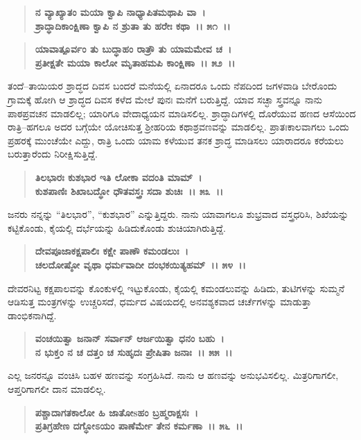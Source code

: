 \begin{verse}
\textbf{ನ ವ್ಯಾಖ್ಯಾತಂ ಮಯಾ ಕ್ವಾಪಿ ನಾಧ್ಯಾಪಿತಮಥಾಪಿ ವಾ~।}\\\textbf{ಶ್ರಾದ್ಧಾದಿಕಾಂಕ್ಷಿಣಾ ಕ್ವಾಪಿ ನ ಶ್ರುತಾ ತು ಹರೇಃ ಕಥಾ~।। ೫೧~।। }
\end{verse}

\begin{verse}
\textbf{ಯಾವಾತ್ಪೂರ್ವಂ ತು ಬುದ್ಧಾಹಂ ರಾತ್ರೌ ತು ಯಾಮಮೇವ ಚ~।}\\\textbf{ಪ್ರತೀಕ್ಷತೇ ಮಯಾ ಕಾಲೋ ಮೃತಾಹಮಪಿ ಕಾಂಕ್ಷಿಣಾ~।। ೫೨~।।}
\end{verse}

ತಂದೆ–ತಾಯಿಯರ ಶ್ರಾದ್ಧದ ದಿವಸ ಬಂದರೆ ಮನೆಯಲ್ಲಿ ಏನಾದರೂ ಒಂದು ನೆಪದಿಂದ ಜಗಳವಾಡಿ ಬೇರೊಂದು ಗ್ರಾಮಕ್ಕೆ ಹೋಗಿ ಆ ಶ್ರಾದ್ಧದ ದಿವಸ ಕಳೆದ ಮೇಲೆ ಪುನಃ ಮನೆಗೆ ಬರುತ್ತಿದ್ದೆ. ಯಾವ ಸಚ್ಛಾ ಸ್ತ್ರವನ್ನೂ ನಾನು ಪಾಠಪ್ರವಚನ ಮಾಡಲಿಲ್ಲ; ಯಾರಿಗೂ ವೇದಾಧ್ಯಯನ ಮಾಡಿಸಲಿಲ್ಲ. ಶ್ರಾದ್ಧಾದಿಗಳಲ್ಲಿ ದೊರೆಯುವ ಹಣದ ಆಸೆಯಿಂದ ರಾತ್ರಿ–ಹಗಲೂ ಅದರ ಬಗ್ಗೆಯೇ ಯೋಚಿಸುತ್ತ ಶ‍್ರೀಹರಿಯ ಕಥಾಶ್ರವಣವನ್ನು ಮಾಡಲಿಲ್ಲ. ಪ್ರಾತಃಕಾಲವಾಗಲು ಒಂದು ಪ್ರಹರಕ್ಕೆ ಮುಂಚೆಯೇ ಎದ್ದು, ರಾತ್ರಿ ಒಂದು ಯಾಮ ಕಳೆಯುವ ತನಕ ಶ್ರಾದ್ಧ ಮಾಡಿಸಲು ಯಾರಾದರೂ ಕರೆಯಲು ಬರುತ್ತಾರೆಂದು ನಿರೀಕ್ಷಿಸುತ್ತಿದ್ದೆ.

\begin{verse}
\textbf{ತಿಲಭಾರಃ ಕುಶಭಾರ ಇತಿ ಲೋಕಾ ವದಂತಿ ಮಾಮ್~।}\\\textbf{ಕುಶಪಾಣಿಃ ಶಿಖಾಬದ್ಧೋ ಧೌತವಸ್ತ್ರಃ ಸದಾ ಶುಚಿಃ~।। ೫೩~।।}
\end{verse}

ಜನರು ನನ್ನನ್ನು “ತಿಲಭಾರ”, “ಕುಶಭಾರ” ಎನ್ನುತ್ತಿದ್ದರು. ನಾನು ಯಾವಾಗಲೂ ಶುಭ್ರವಾದ ವಸ್ತ್ರಧರಿಸಿ, ಶಿಖೆಯನ್ನು ಕಟ್ಟಿಕೊಂಡು, ಕೈಯಲ್ಲಿ ದರ್ಭೆಯನ್ನು ಹಿಡಿದುಕೊಂಡು ಶುಚಿಯಾಗಿರುತ್ತಿದ್ದೆ.

\begin{verse}
\textbf{ದೇವಪೂಜಾಕಕ್ಷಪಾಲಿಃ ಕಕ್ಷೇ ಪಾಣೌ ಕಮಂಡಲುಃ~।}\\\textbf{ಚಲದೋಷ್ಠೋ ವೃಥಾ ಧರ್ಮವಾದೀ ದಂಭಕಯಿತ್ಯಹಮ್~।। ೫೪~।।}
\end{verse}

ದೇವರನಿಟ್ಟ ಕಕ್ಷಪಾಲವನ್ನು ಕೊಂಕುಳಲ್ಲಿ ಇಟ್ಟುಕೊಂಡು, ಕೈಯಲ್ಲಿ ಕಮಂಡಲುವನ್ನು ಹಿಡಿದು, ತುಟಿಗಳನ್ನು ಸುಮ್ಮನೆ ಆಡಿಸುತ್ತ ಮಂತ್ರಗಳನ್ನು ಉಚ್ಚರಿಸದೆ, ಧರ್ಮದ ವಿಷಯದಲ್ಲಿ ಅನವಶ್ಯಕವಾದ ಚರ್ಚೆಗಳನ್ನು ಮಾಡುತ್ತಾ ಡಾಂಭಿಕನಾಗಿದ್ದೆ.

\begin{verse}
\textbf{ವಂಚಯಿತ್ವಾ ಜನಾನ್ ಸರ್ವಾನ್ ಆರ್ಜಯಿತ್ವಾ ಧನಂ ಬಹು~।}\\\textbf{ನ ಭುಕ್ತಂ ನ ಚ ದತ್ತಂ ಚ ಸುಹೃದಃ ಪ್ರೇಷಿತಾ ಜನಾಃ~।। ೫೫~।।}
\end{verse}

ಎಲ್ಲ ಜನರನ್ನೂ ವಂಚಿಸಿ ಬಹಳ ಹಣವನ್ನು ಸಂಗ್ರಹಿಸಿದೆ. ನಾನು ಆ ಹಣವನ್ನು ಅನುಭವಿಸಲಿಲ್ಲ. ಮಿತ್ರರಿಗಾಗಲೀ, ಆಪ್ತರಿಗಾಗಲೀ ದಾನ ಮಾಡಲಿಲ್ಲ.

\begin{verse}
\textbf{ಪಶ್ಚಾದಾಗತಕಾಲೋ ಹಿ ಜಾತೋsಹಂ ಬ್ರಹ್ಮರಾಕ್ಷಸಃ~।}\\\textbf{ಪ್ರತಿಗ್ರಹೇಣ ದಗ್ಧೋಽಯಂ ಪಾಣೆರ್ಮೇ ತೇನ ಕರ್ಮಣಾ~।। ೫೬~।।} 
\end{verse}

